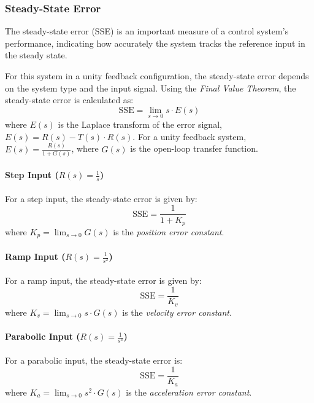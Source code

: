 \documentclass{article}
\begin{document}
\subsubsection{Steady-State Error}

The steady-state error (SSE) is an important measure of a control system’s performance, indicating how accurately the system tracks the reference input in the steady state.

For this system in a unity feedback configuration, the steady-state error depends on the system type and the input signal. Using the \textit{Final Value Theorem}, the steady-state error is calculated as:
\[
\text{SSE} = \lim_{s \to 0} s \cdot E(s)
\]
where \( E(s) \) is the Laplace transform of the error signal, \( E(s) = R(s) - T(s) \cdot R(s) \). For a unity feedback system, \( E(s) = \frac{R(s)}{1 + G(s)} \), where \( G(s) \) is the open-loop transfer function.

\paragraph{Step Input (\( R(s) = \frac{1}{s} \))}  
For a step input, the steady-state error is given by:
\[
\text{SSE} = \frac{1}{1 + K_p}
\]
where \( K_p = \lim_{s \to 0} G(s) \) is the \textit{position error constant}. %

\paragraph{Ramp Input (\( R(s) = \frac{1}{s^2} \))}  
For a ramp input, the steady-state error is given by:
\[
\text{SSE} = \frac{1}{K_v}
\]
where \( K_v = \lim_{s \to 0} s \cdot G(s) \) is the \textit{velocity error constant}. %

\paragraph{Parabolic Input (\( R(s) = \frac{1}{s^3} \))}  
For a parabolic input, the steady-state error is:
\[
\text{SSE} = \frac{1}{K_a}
\]
where \( K_a = \lim_{s \to 0} s^2 \cdot G(s) \) is the \textit{acceleration error constant}. %
\end{document}
